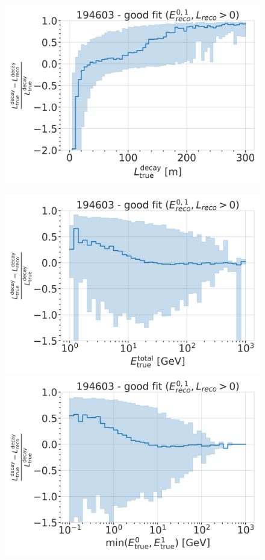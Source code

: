 \begin{figure}[h]
	\centering
    \includegraphics{figures/model_independent_simulation/results/realistic/resolutions/194603_median_decay_length_bias_goodfit_log_unweighted.png}
    \caption[]{}
\end{figure}


\begin{figure}[h]
	\centering
    \includegraphics[width=0.49\linewidth]{figures/model_independent_simulation/results/realistic/resolutions/194603_median_decay_length_bias_vs_tot_energy_goodfit_log_unweighted.png}
    \includegraphics[width=0.49\linewidth]{figures/model_independent_simulation/results/realistic/resolutions/194603_median_decay_length_bias_vs_min_energy_goodfit_log_unweighted.png} 
    \caption[]{}
\end{figure}


